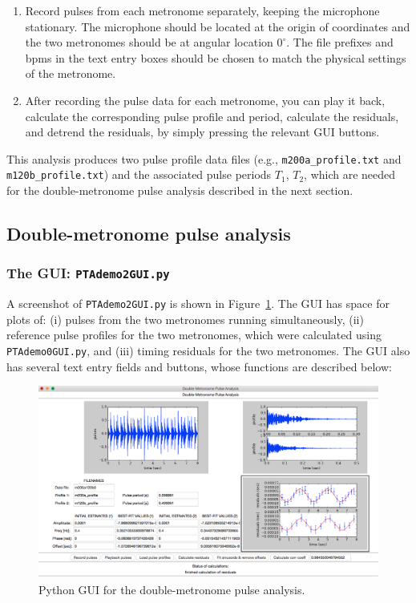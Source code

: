 \documentclass[10pt]{NSF}
\def\ben{\begin{enumerate}}
\def\een{\end{enumerate}}
\def\i{\item{}}
\begin{document}
\ben

\i Record pulses from each metronome separately, keeping the 
microphone stationary.
The microphone should be located at the origin of coordinates and the two
metronomes should be at angular location $0^\circ$.
The file prefixes and bpms in the text entry boxes should be chosen
to match the physical settings of the metronome.

\i After recording the pulse data for each metronome, you can play it 
back, calculate the corresponding pulse profile and period, calculate
the residuals, and detrend the residuals, by simply pressing the relevant
GUI buttons.
\een

This analysis produces two pulse profile data files 
(e.g., {\tt m200a\_profile.txt} and {\tt m120b\_profile.txt}) and the 
associated pulse periods $T_1$, $T_2$, which are needed for the 
double-metronome pulse analysis described in the next section.

\subsection{Double-metronome pulse analysis}
\label{s:PTAdemo2GUI}

\subsubsection{The GUI: {\tt PTAdemo2GUI.py}}

A screenshot of {\tt PTAdemo2GUI.py} is shown in 
Figure~\ref{f:PTAdemo2GUI}.
The GUI has space for plots of:
(i) pulses from the two metronomes running simultaneously,
(ii) reference pulse profiles for the two metronomes, which were 
calculated using {\tt PTAdemo0GUI.py}, and
(iii) timing residuals for the two metronomes.
The GUI also has several text entry fields and buttons, whose functions
are described below:
%
\begin{figure}[hbtp!]
\begin{center}
\includegraphics[clip=true, angle=0, width=\textwidth]{figures/PTAdemo2GUI.png}
\caption{Python GUI for the double-metronome pulse analysis.}
\label{f:PTAdemo2GUI}
\end{center}
\end{figure}
\end{document}

